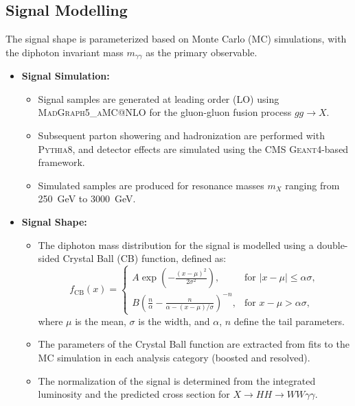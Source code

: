 \subsection{Signal Modelling}
The signal shape is parameterized based on Monte Carlo (MC) simulations, with the diphoton invariant mass \(m_{\gamma\gamma}\) as the primary observable.

\begin{itemize}
    \item \textbf{Signal Simulation:}
    \begin{itemize}
        \item Signal samples are generated at leading order (LO) using \textsc{MadGraph5\_aMC@NLO} for the gluon-gluon fusion process \(gg \to X\).
        \item Subsequent parton showering and hadronization are performed with \textsc{Pythia8}, and detector effects are simulated using the CMS \textsc{Geant4}-based framework.
        \item Simulated samples are produced for resonance masses \(m_X\) ranging from 250~GeV to 3000~GeV.
    \end{itemize}

    \item \textbf{Signal Shape:}
    \begin{itemize}
        \item The diphoton mass distribution for the signal is modelled using a double-sided Crystal Ball (CB) function, defined as:
        \[
        f_{\text{CB}}(x) =
        \begin{cases}
            A \exp\left(-\frac{(x-\mu)^2}{2\sigma^2}\right), & \text{for } |x-\mu| \leq \alpha\sigma, \\
            B \left(\frac{n}{\alpha} - \frac{n}{\alpha - (x-\mu)/\sigma} \right)^{-n}, & \text{for } x-\mu > \alpha\sigma,
        \end{cases}
        \]
        where \(\mu\) is the mean, \(\sigma\) is the width, and \(\alpha\), \(n\) define the tail parameters.
        \item The parameters of the Crystal Ball function are extracted from fits to the MC simulation in each analysis category (boosted and resolved).
        \item The normalization of the signal is determined from the integrated luminosity and the predicted cross section for \(X \to HH \to WW\gamma\gamma\).
    \end{itemize}


\end{itemize}
